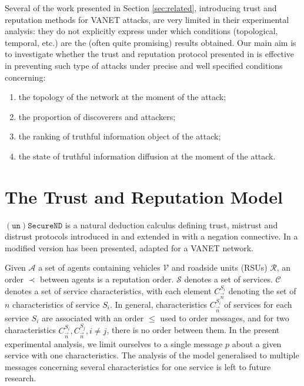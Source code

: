 \documentclass[compsoc, conference, letterpaper, 10pt, times]{IEEEtran}
\begin{document}
Several of the work presented in Section \ref{sec:related}, introducing trust and reputation methods for VANET attacks, are very limited in their experimental analysis: they do not explicitly express under which conditions (topological, temporal, etc.) are the (often quite promising) results obtained. Our main aim is to investigate whether the trust and reputation protocol presented in \cite{DBLP:conf/eurosp/PrimieroRCN17} is effective in preventing such type of attacks under precise and well specified conditions concerning:
\begin{enumerate}
\item the topology of the network at the moment of the attack;
\item the proportion of discoverers and attackers;
\item the ranking of truthful information object of the attack;
\item the state of truthful information diffusion at the moment of the attack.
\end{enumerate}

\section{The Trust and Reputation Model}\label{sec:model}

$\mathtt{(un)SecureND}$ is a natural deduction calculus defining trust, mistrust and distrust protocols introduced in \cite{DBLP:conf/pst/PrimieroR14} and extended in \cite{DBLP:conf/ifiptm/Primiero16} with a negation connective. In \cite{DBLP:conf/eurosp/PrimieroRCN17} a modified version has been presented, adapted for a VANET network.

Given $\mathcal{A}$ a set of agents containing vehicles $\mathcal{V}$ and roadside units (RSUs) $\mathcal{R}$, an order $\prec$ between agents is a reputation order. $\mathcal{S}$ denotes a set of services. $\mathcal{C}$ denotes a set of service characteristics, with each element $C^{S_i}_{\overrightarrow{n}}$ denoting the set of $n$ characteristics of service $S_{i}$. In general, characteristics $C^{S_i}_{\overrightarrow{n}}$ of services for each service $S_i$ are associated with an order $\leq$ used to order messages, and for two characteristics
$C^{S_{i}}_{\overrightarrow{n}}, C^{S_{j}}_{\overrightarrow{n}}, i\neq j$, there is no order between  them. In the present experimental analysis, we limit ourselves to a single message $p$ about a given service with one characteristics. The analysis of the model generalised to multiple messages concerning several characteristics for one service is left to future research.
\end{document}
